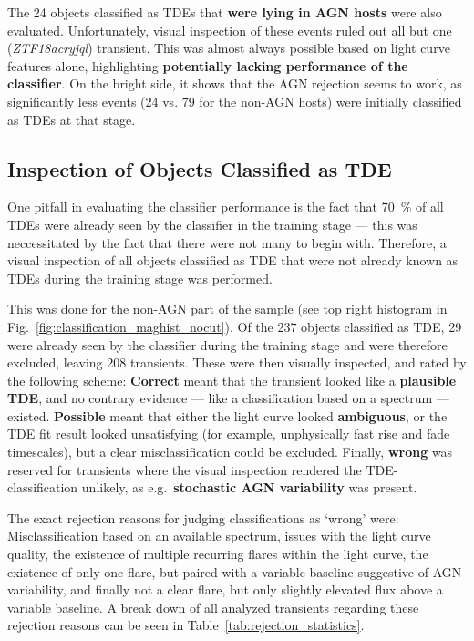 The 24 objects classified as TDEs that \textbf{were lying in AGN hosts} were also evaluated. Unfortunately, visual inspection of these events ruled out all but one (\textit{ZTF18acryjql}) transient. This was almost always possible based on light curve features alone, highlighting \textbf{potentially lacking performance of the classifier}. On the bright side, it shows that the AGN rejection seems to work, as significantly less events (24 vs. 79 for the non-AGN hosts) were initially classified as TDEs at that stage.

\subsection{Inspection of Objects Classified as TDE}\label{all_tde_inspection}
One pitfall in evaluating the classifier performance is the fact that \SI{70}{\percent} of all TDEs were already seen by the classifier in the training stage --- this was neccessitated by the fact that there were not many to begin with. Therefore, a visual inspection of all objects classified as TDE that were not already known as TDEs during the training stage was performed.

This was done for the non-AGN part of the sample (see top right histogram in Fig.~\ref{fig:classification_maghist_nocut}). Of the 237 objects classified as TDE, 29 were already seen by the classifier during the training stage and were therefore excluded, leaving 208 transients. These were then visually inspected, and rated by the following scheme: \textbf{Correct} meant that the transient looked like a \textbf{plausible TDE}, and no contrary evidence --- like a classification based on a spectrum --- existed. \textbf{Possible} meant that either the light curve looked \textbf{ambiguous}, or the TDE fit result looked unsatisfying (for example, unphysically fast rise and fade timescales), but a clear misclassification could be excluded. Finally, \textbf{wrong} was reserved for transients where the visual inspection rendered the TDE-classification unlikely, as e.g.~\textbf{stochastic AGN variability} was present.

The exact rejection reasons for judging classifications as `wrong' were: Misclassification based on an available spectrum, issues with the light curve quality, the existence of multiple recurring flares within the light curve, the existence of only one flare, but paired with a variable baseline suggestive of AGN variability, and finally not a clear flare, but only slightly elevated flux above a variable baseline. A break down of all analyzed transients regarding these rejection reasons can be seen in Table~\ref{tab:rejection_statistics}.

